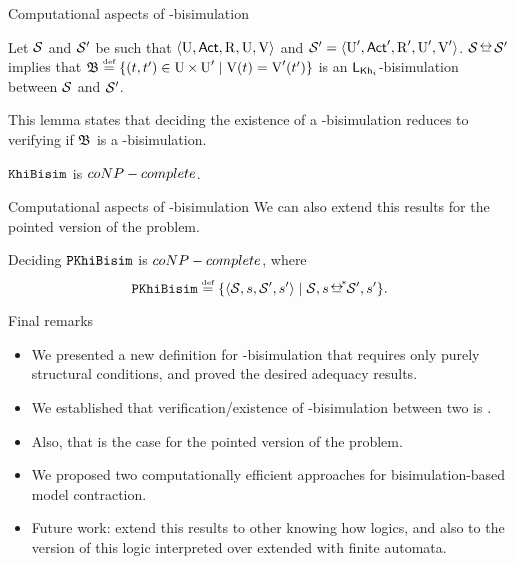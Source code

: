 \documentclass{beamer}
\begin{document}

\begin{frame}{Computational aspects of \KHilogic-bisimulation}
    \begin{lemma}
        Let $\mathcal{S}$ and $\mathcal{S}'$ be \ults such that $\langle \operatorname{U},{\rm \sf Act},\operatorname{R},\operatorname{U},\operatorname{V} \rangle$ and $\mathcal{S}' = \langle \operatorname{U}',{\rm \sf Act}',\operatorname{R}',\operatorname{U}',\operatorname{V}' \rangle$.
        $\model\bisim\model'$ implies that $\universalbis\eqdef\set{(t,t')\in\S\times\S'\mid \V(t)=\V'(t')}$ is an $\mathsf{L}_{\operatorname{\sf Kh}_i}$-bisimulation between $\mathcal{S}$ and $\mathcal{S}'$. 
    \end{lemma}\pause

    This lemma states that deciding the existence of a \KHilogic-bisimulation reduces to verifying if $\mathfrak{B}$ is a \KHilogic-bisimulation.\pause

    \begin{theorem}
        $\mathtt{KhiBisim}$ is ${coNP-complete}$.
    \end{theorem}
\end{frame}


\begin{frame}{Computational aspects of \KHilogic-bisimulation}
    We can also extend this results for the pointed version of the problem.\pause

    \begin{corollary}
        Deciding $\mathtt{PKhiBisim}$ is ${coNP-complete}$, where 
        \[ 
            \pkhibisimpb \eqdef \set{\tup{\model,s,\model',s'} \mid \model,s \nbisim\model',s'}.
        \]
    \end{corollary}
\end{frame}




\begin{frame}
    {Final remarks}

    \begin{small}
        \begin{itemize}
            \item We presented a new definition for \KHilogic-bisimulation that requires only purely structural conditions, and proved the desired adequacy results. \pause
            \item We established that verification/existence of \KHilogic-bisimulation between two \ultss is \coNPComplete. \pause
            \item Also, that is the case for the pointed version of the problem. \pause
            \item We proposed two computationally efficient approaches for bisimulation-based model contraction. \pause
            \item Future work: extend this results to other knowing how logics, and also to the version of this logic interpreted 
            over \ults extended with finite automata.
        \end{itemize}
    \end{small}
\end{frame}

\end{document}
